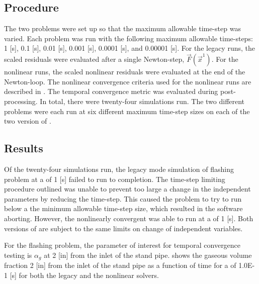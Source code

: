 \subsection{Procedure}
\label{subsect:procedures}

The two problems were set up so that the maximum allowable time-step was varied.
Each problem was run with the following maximum allowable time-steps: 1 [s], 0.1 [s], 0.01 [s], 0.001 [s], 0.0001 [s], and 0.00001 [s]. 
For the legacy runs, the scaled residuals were evaluated after a single Newton-step, $\vec{F}(\vec{x}^{1})$.
For the nonlinear runs, the scaled nonlinear residuals were evaluated at the end of the Newton-loop.
The nonlinear convergence criteria used for the nonlinear runs are described in .
The temporal convergence metric was evaluated during post-processing.
In total, there were twenty-four simulations run.
The two different problems were each run at six different maximum time-step sizes on each of the two version of \cobra{}.

\subsection{Results}
\label{subsect:results}

Of the twenty-four simulations run, the legacy mode simulation of flashing problem at a \dtmax{} of 1 [s] failed to run to completion.
The time-step limiting procedure outlined  was unable to prevent too large a change in the independent parameters by reducing the time-step.
This caused the problem to try to run below a the minimum allowable time-step size, which resulted in the software aborting.
However, the nonlinearly convergent \cobra{} was able to run at a \dtmax{} of 1 [s].
Both versions of \cobra{} are subject to the same limits on change of independent variables.

For the flashing problem, the parameter of interest for temporal convergence testing is $\alpha_g$ at 2 [in] from the inlet of the stand pipe.
 shows the gaseous volume fraction 2 [in] from the inlet of the stand pipe as a function of time for a \dtmax{} of 1.0E-1 [s] for both the legacy and the nonlinear solvers.

